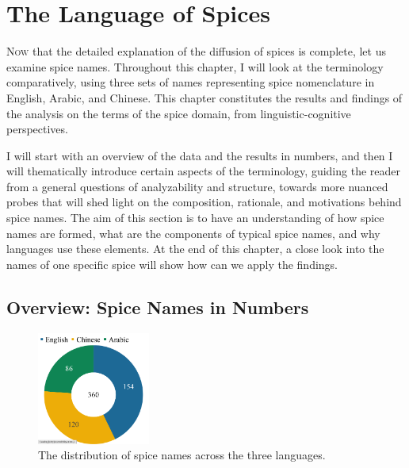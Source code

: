 \chapter{The Language of Spices}
\label{ch:language}



\lettrine[lines=\iniciale]{\textcolor{\accentcolor}{N}}{ow} that the detailed explanation of the diffusion of spices is complete, let us examine spice names. Throughout this chapter, I will look at the terminology comparatively, using three sets of names representing spice nomenclature in English, Arabic, and Chinese. This chapter constitutes the results and findings of the analysis on the terms of the spice domain, from linguistic-cognitive perspectives. 

I will start with an overview of the data and the results in numbers, and then I will thematically introduce certain aspects of the terminology, guiding the reader from a general questions of analyzability and structure, towards more nuanced probes that will shed light on the composition, rationale, and motivations behind spice names. The aim of this section is to have an understanding of how spice names are formed, what are the components of typical spice names, and why languages use these elements. At the end of this chapter, a close look into the names of one specific spice will show how can we apply the findings. 

\section{Overview: Spice Names in Numbers}

\begin{figure}
  \vspace{-\baselineskip}
  \includegraphics[width=0.33\textwidth]{imgs/plots/languages_pie.pdf}
  \caption{The distribution of spice names across the three languages.}
  \label{fig:languages_pie}
\end{figure}

